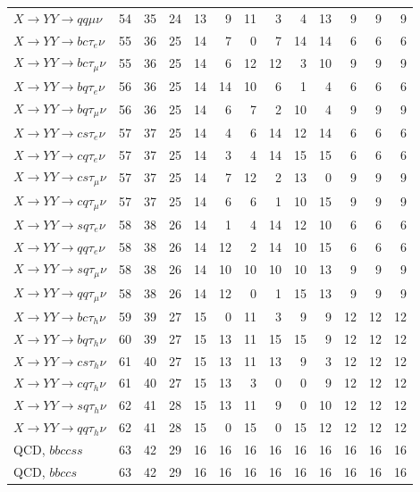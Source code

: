 {\begin{longtable}{l rrrrrrrrrrrr}
$X\to YY\to qq\mu\nu$ & 54 & 35 & 24 & 13 & 9 & 11 & 3 & 4 & 13 & 9 & 9 & 9 \\
\addlinespace[2pt]
$X\to YY\to bc\tau_e\nu$ & 55 & 36 & 25 & 14 & 7 & 0 & 7 & 14 & 14 & 6 & 6 & 6 \\
$X\to YY\to bc\tau_\mu\nu$ & 55 & 36 & 25 & 14 & 6 & 12 & 12 & 3 & 10 & 9 & 9 & 9 \\
$X\to YY\to bq\tau_e\nu$ & 56 & 36 & 25 & 14 & 14 & 10 & 6 & 1 & 4 & 6 & 6 & 6 \\
$X\to YY\to bq\tau_\mu\nu$ & 56 & 36 & 25 & 14 & 6 & 7 & 2 & 10 & 4 & 9 & 9 & 9 \\
$X\to YY\to cs\tau_e\nu$ & 57 & 37 & 25 & 14 & 4 & 6 & 14 & 12 & 14 & 6 & 6 & 6 \\
$X\to YY\to cq\tau_e\nu$ & 57 & 37 & 25 & 14 & 3 & 4 & 14 & 15 & 15 & 6 & 6 & 6 \\
$X\to YY\to cs\tau_\mu\nu$ & 57 & 37 & 25 & 14 & 7 & 12 & 2 & 13 & 0 & 9 & 9 & 9 \\
$X\to YY\to cq\tau_\mu\nu$ & 57 & 37 & 25 & 14 & 6 & 6 & 1 & 10 & 15 & 9 & 9 & 9 \\
$X\to YY\to sq\tau_e\nu$ & 58 & 38 & 26 & 14 & 1 & 4 & 14 & 12 & 10 & 6 & 6 & 6 \\
$X\to YY\to qq\tau_e\nu$ & 58 & 38 & 26 & 14 & 12 & 2 & 14 & 10 & 15 & 6 & 6 & 6 \\
$X\to YY\to sq\tau_\mu\nu$ & 58 & 38 & 26 & 14 & 10 & 10 & 10 & 10 & 13 & 9 & 9 & 9 \\
$X\to YY\to qq\tau_\mu\nu$ & 58 & 38 & 26 & 14 & 12 & 0 & 1 & 15 & 13 & 9 & 9 & 9 \\
\addlinespace[2pt]
$X\to YY\to bc\tau_h\nu$ & 59 & 39 & 27 & 15 & 0 & 11 & 3 & 9 & 9 & 12 & 12 & 12 \\
$X\to YY\to bq\tau_h\nu$ & 60 & 39 & 27 & 15 & 13 & 11 & 15 & 15 & 9 & 12 & 12 & 12 \\
$X\to YY\to cs\tau_h\nu$ & 61 & 40 & 27 & 15 & 13 & 11 & 13 & 9 & 3 & 12 & 12 & 12 \\
$X\to YY\to cq\tau_h\nu$ & 61 & 40 & 27 & 15 & 13 & 3 & 0 & 0 & 9 & 12 & 12 & 12 \\
$X\to YY\to sq\tau_h\nu$ & 62 & 41 & 28 & 15 & 13 & 11 & 9 & 0 & 10 & 12 & 12 & 12 \\
$X\to YY\to qq\tau_h\nu$ & 62 & 41 & 28 & 15 & 0 & 15 & 0 & 15 & 12 & 12 & 12 & 12 \\
\addlinespace[2pt]
QCD, $bbccss$ & 63 & 42 & 29 & 16 & 16 & 16 & 16 & 16 & 16 & 16 & 16 & 16 \\
QCD, $bbccs$ & 63 & 42 & 29 & 16 & 16 & 16 & 16 & 16 & 16 & 16 & 16 & 16 \\

\end{longtable}}
